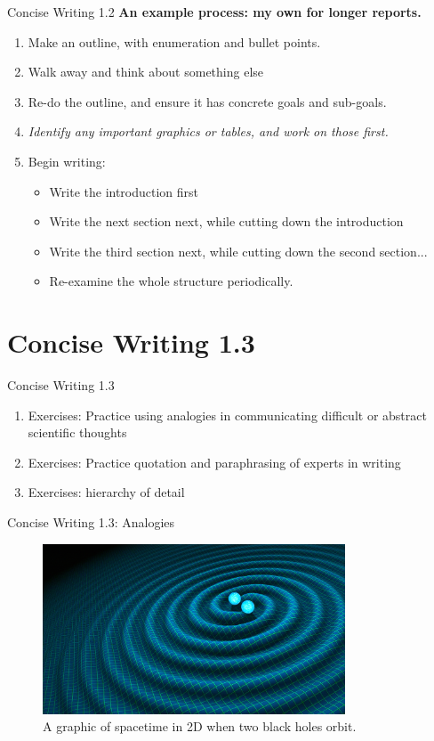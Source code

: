 \documentclass{beamer}
\begin{document}
\begin{frame}{Concise Writing 1.2}
\textbf{An example process: my own for longer reports.}
\begin{enumerate}
\item Make an outline, with enumeration and bullet points.
\item Walk away and think about something else
\item Re-do the outline, and ensure it has concrete goals and sub-goals.
\item \textit{Identify any important graphics or tables, and work on those first.}
\item Begin writing:
\begin{itemize}
\item Write the introduction first
\item Write the next section next, while cutting down the introduction
\item Write the third section next, while cutting down the second section...
\item Re-examine the whole structure periodically.
\end{itemize}
\end{enumerate}
\end{frame}

\section{Concise Writing 1.3}

\begin{frame}{Concise Writing 1.3}
\begin{enumerate}
\item Exercises: Practice using analogies in communicating difficult or abstract scientific thoughts
\item Exercises: Practice quotation and paraphrasing of experts in writing
\item Exercises: hierarchy of detail
\end{enumerate}
\end{frame}

\begin{frame}{Concise Writing 1.3: Analogies}
\begin{figure}
\includegraphics[width=9cm]{figures/waves.jpg}
\caption{\label{fig:waves} A graphic of spacetime in 2D when two black holes orbit.}
\end{figure}
\end{frame}
\end{document}

